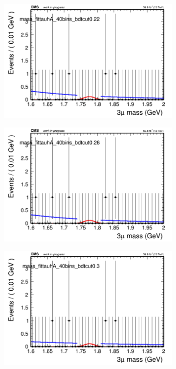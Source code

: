 \begin{figure}[H]
\begin{subfigure}{0.2\textwidth}
        \includegraphics[width=\textwidth]{power_law/plots/tauhA/massfit_tauhA_40bins_bdtcut0.22.png}
        \caption{}
    \end{subfigure}
    \begin{subfigure}{0.2\textwidth}
        \includegraphics[width=\textwidth]{power_law/plots/tauhA/massfit_tauhA_40bins_bdtcut0.26.png}
        \caption{}
    \end{subfigure}
    \begin{subfigure}{0.2\textwidth}
        \includegraphics[width=\textwidth]{power_law/plots/tauhA/massfit_tauhA_40bins_bdtcut0.3.png}

\end{subfigure}
\end{figure}
